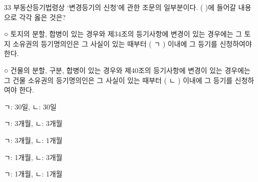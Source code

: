 \begin{question}{33}
부동산등기법령상 ‘변경등기의 신청’에 관한 조문의 일부분이다. ( )에 들어갈 내용으로 각각 옳은 것은?
\begin{framedtext}
○ 토지의 분할, 합병이 있는 경우와 제34조의 등기사항에 변경이 있는 경우에는 그 토지 소유권의 등기명의인은 그 사실이 있는 때부터 ( ㄱ ) 이내에 그 등기를 신청하여야 한다. \par
○ 건물의 분할, 구분, 합병이 있는 경우와 제40조의 등기사항에 변경이 있는 경우에는 그 건물 소유권의 등기명의인은 그 사실이 있는 때부터 ( ㄴ ) 이내에 그 등기를 신청하여야 한다. \par
\end{framedtext}
\begin{choices}
  \item ㄱ: 30일, ㄴ: 30일
  \item ㄱ: 3개월, ㄴ: 3개월
  \item ㄱ: 3개월, ㄴ: 1개월
  \item ㄱ: 1개월, ㄴ: 3개월
  \item ㄱ: 1개월, ㄴ: 1개월
\end{choices}
\end{question}
